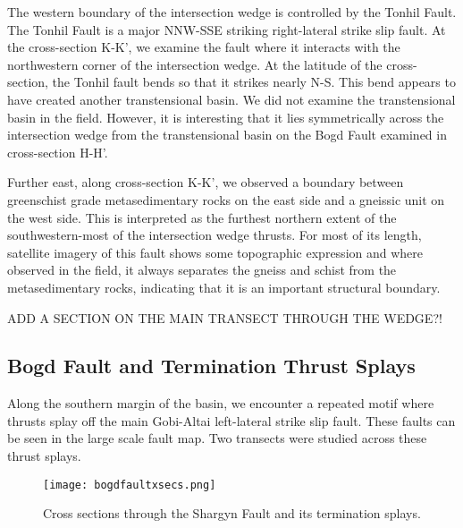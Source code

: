 The western boundary of the intersection wedge is controlled by the Tonhil Fault. The Tonhil Fault is a major NNW-SSE striking right-lateral strike slip fault. At the cross-section K-K', we examine the fault where it interacts with the northwestern corner of the intersection wedge. At the latitude of the cross-section, the Tonhil fault bends so that it strikes nearly N-S. This bend appears to have created another transtensional basin. We did not examine the transtensional basin in the field. However, it is interesting that it lies symmetrically across the intersection wedge from the transtensional basin on the Bogd Fault examined in cross-section H-H'. 

Further east, along cross-section K-K', we observed a boundary between greenschist grade metasedimentary rocks on the east side and a gneissic unit on the west side. This is interpreted as the furthest northern extent of the southwestern-most of the intersection wedge thrusts. For most of its length, satellite imagery of this fault shows some topographic expression and where observed in the field, it always separates the gneiss and schist from the metasedimentary rocks, indicating that it is an important structural boundary. 

ADD A SECTION ON THE MAIN TRANSECT THROUGH THE WEDGE?!

\subsection{Bogd Fault and Termination Thrust Splays}

Along the southern margin of the basin, we encounter a repeated motif where thrusts splay off the main Gobi-Altai left-lateral strike slip fault. These faults can be seen in the large scale fault map. Two transects were studied across these thrust splays. 

\begin{figure}[h!]
  \centering
  \texttt{[image: bogdfaultxsecs.png]}
  \caption{Cross sections through the Shargyn Fault and its termination splays.}
  \label{bogdfaultxsecs}
\end{figure}

